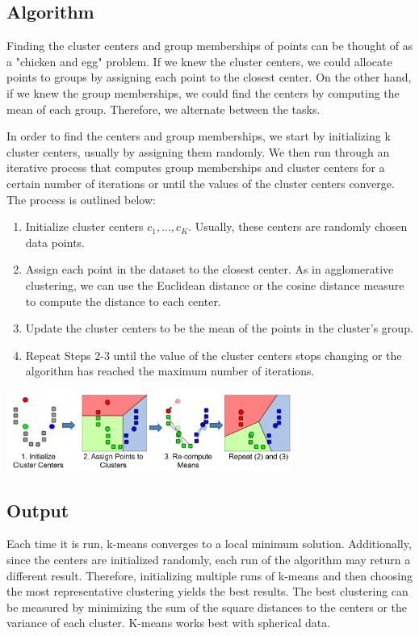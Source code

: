 \documentclass{article}
\begin{document}
\subsection{Algorithm}
Finding the cluster centers and group memberships of points can be thought of as a "chicken and egg" problem. If we knew the cluster centers, we could allocate points to groups by assigning each point to the closest center. On the other hand, if we knew the group memberships, we could find the centers by computing the mean of each group. Therefore, we alternate between the tasks.

In order to find the centers and group memberships, we start by initializing k cluster centers, usually by assigning them randomly. We then run through an iterative process that computes group memberships and cluster centers for a certain number of iterations or until the values of the cluster centers converge. The process is outlined below:

\begin{enumerate}
    \item Initialize cluster centers $c_1, ... , c_K$. Usually, these centers are randomly chosen data points.
    \item Assign each point in the dataset to the closest center. As in agglomerative clustering, we can use the Euclidean distance or the cosine distance measure to compute the distance to each center.
    \item Update the cluster centers to be the mean of the points in the cluster's group.
    \item Repeat Steps 2-3 until the value of the cluster centers stops changing or the algorithm has reached the maximum number of iterations.
\end{enumerate}

\begin{minipage}{\linewidth}
\begin{center}
\includegraphics[width=0.70\textwidth]{k-means-algorithm.png}
\end{center}
\end{minipage}

\subsection{Output}
Each time it is run, k-means converges to a local minimum solution. Additionally, since the centers are initialized randomly, each run of the algorithm may return a different result. Therefore, initializing multiple runs of k-means and then choosing the most representative clustering yields the best results. The best clustering can be measured by minimizing the sum of the square distances to the centers or the variance of each cluster. K-means works best with spherical data.
\end{document}
